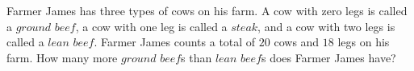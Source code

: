 Farmer James has three types of cows on his farm. A cow with zero legs is called a $\textit{ground beef}$, a cow with one leg is called a $\textit{steak}$, and a cow with two legs is called a $\textit{lean beef}$. Farmer James counts a total of $20$ cows and $18$ legs on his farm. How many more $\textit{ground beef}$s than $\textit{lean beef}$s does Farmer James have?
